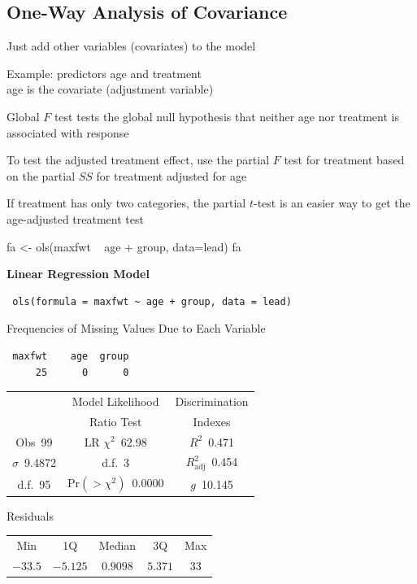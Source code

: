 \subsection{One-Way Analysis of Covariance} 
\bi
\item Just add other variables (covariates) to the model
\item Example: predictors age and treatment \\
  age is the covariate (adjustment variable)
\item Global $F$ test tests the global null hypothesis that neither
  age nor treatment is associated with response
\item To test the adjusted treatment effect, use the partial $F$ test
  for treatment based on the partial $SS$ for treatment adjusted for
  age
\item If treatment has only two categories, the partial $t$-test is an
  easier way to get the age-adjusted treatment test
\begin{Sinput}
fa <- ols(maxfwt ~ age + group, data=lead)
fa
\end{Sinput}

 \centerline{\textbf{Linear Regression Model}}
 
 \begin{verbatim}
 ols(formula = maxfwt ~ age + group, data = lead)
 \end{verbatim}
 
 \begin{center}
 Frequencies of Missing Values Due to Each Variable
 
 \smallskip
 
 \begin{verbatim}
 maxfwt    age  group 
     25      0      0 
 \end{verbatim}
 
 \end{center}
 {\selectfont \begin{center}\begin{tabular}{|c|c|c|}\hline
&Model Likelihood&Discrimination\\
&Ratio Test&Indexes\\\hline
Obs~\hfill 99&LR $\chi^{2}$~\hfill 62.98&$R^{2}$~\hfill 0.471\\
$\sigma$~\hfill 9.4872&d.f.~\hfill 3&$R^{2}_{\textrm{adj}}$~\hfill 0.454\\
d.f.~\hfill 95&Pr$(>\chi^{2})$~\hfill 0.0000&$g$~\hfill 10.145\\
\hline
\end{tabular}
\end{center}}
 \begin{center}
 Residuals
 

 \begin{tabular}{ccccc}
Min&1Q&Median&3Q&Max\\
$-33.5$&$-5.125$&$0.9098$&$5.371$&$33$\\
\end{tabular}
 \end{center}
 
